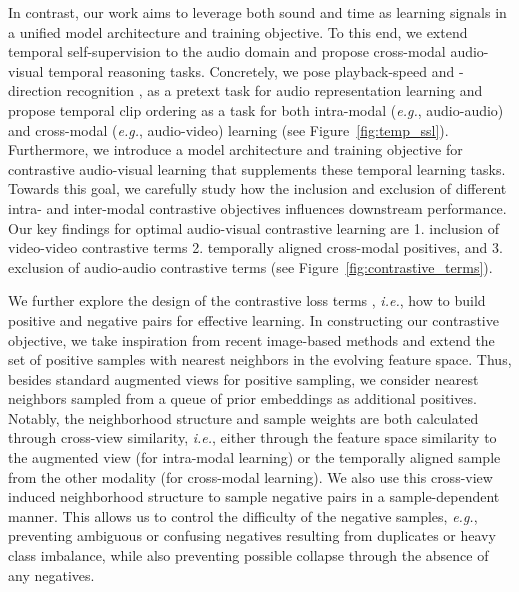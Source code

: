 \documentclass[letterpaper]{article} %
\newcommand{\eg}{\emph{e.g.}}
\newcommand{\ie}{\emph{i.e.}}
\begin{document}
In contrast, our work aims to leverage both sound and time as learning signals in a unified model architecture and training objective.
To this end, we extend temporal self-supervision to the audio domain and propose cross-modal audio-visual temporal reasoning tasks.
Concretely, we pose playback-speed and -direction recognition \cite{wei2018learning,benaim2020speednet,jenni2020video}, as a pretext task for audio representation learning and propose temporal clip ordering as a task for both intra-modal (\eg, audio-audio) and cross-modal (\eg, audio-video) learning (see Figure~\ref{fig:temp_ssl}).
Furthermore, we introduce a model architecture and training objective for contrastive audio-visual learning that supplements these temporal learning tasks.
Towards this goal, we carefully study how the inclusion and exclusion of different intra- and inter-modal contrastive objectives influences downstream performance.
Our key findings for optimal audio-visual contrastive learning are 1. inclusion of video-video contrastive terms 2. temporally aligned cross-modal positives, and 3. exclusion of audio-audio contrastive terms (see Figure~\ref{fig:contrastive_terms}).

We further explore the design of the contrastive loss terms \cite{wu2018unsupervised}, \ie, how to build positive and negative pairs for effective learning.
In constructing our contrastive objective, we take inspiration from recent image-based methods \cite{dwibedi2021little,koohpayegani2021mean} and extend the set of positive samples with nearest neighbors in the evolving feature space.
Thus, besides standard augmented views for positive sampling, we consider nearest neighbors sampled from a queue of prior embeddings as additional positives.
Notably, the neighborhood structure and sample weights are both calculated through cross-view similarity, \ie, either through the feature space similarity to the augmented view (for intra-modal learning) or the temporally aligned sample from the other modality (for cross-modal learning).
We also use this cross-view induced neighborhood structure to sample negative pairs in a sample-dependent manner.
This allows us to control the difficulty of the negative samples, \eg, preventing ambiguous or confusing negatives resulting from duplicates or heavy class imbalance, while also preventing possible collapse through the absence of any negatives.
\end{document}
